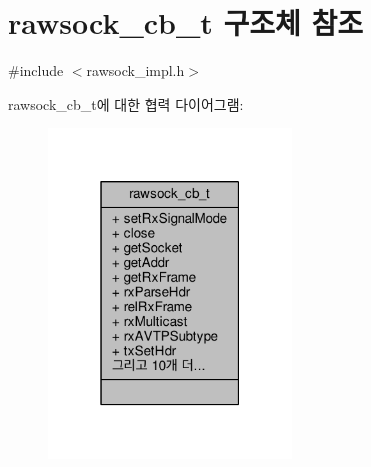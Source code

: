 \hypertarget{structrawsock__cb__t}{}\section{rawsock\+\_\+cb\+\_\+t 구조체 참조}
\label{structrawsock__cb__t}


{\ttfamily \#include $<$rawsock\+\_\+impl.\+h$>$}



rawsock\+\_\+cb\+\_\+t에 대한 협력 다이어그램\+:
\nopagebreak
\begin{figure}[H]
\begin{center}
\leavevmode
\includegraphics[width=183pt]{structrawsock__cb__t__coll__graph}
\end{center}
\end{figure}
